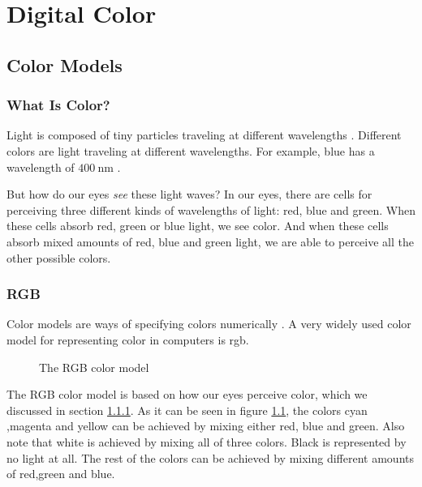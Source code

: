 \begin{comment}
  
\end{comment}

\chapter{Digital Color}
\label{cha:color}

\begin{refsection}

  \section{Color Models}
  \label{sec:color-models}

  \subsection{What Is Color?}
  \label{sec:what-color}

  \newcommand{\bluewave}{\ensuremath{\SI{400}{\nano\meter}}}

  Light is composed of tiny particles traveling at different
  wavelengths \cite{neider93:_openg_progr_guide}.
  Different colors are light traveling at different wavelengths. For
  example, blue has a wavelength of \bluewave
  \cite{ohlsson99:_digit_bild_kreat}.

  But how do our eyes \textit{see} these light waves? In our eyes,
  there are cells for perceiving three different kinds of wavelengths
  of light: red, blue and green. When these cells absorb red, green or
  blue light, we see color. And when these cells absorb mixed amounts
  of red, blue and green light, we are able to perceive all the other
  possible colors.

  \subsection{RGB}
  \label{sec:rgb}

  Color models are ways of specifying colors
  numerically \cite{fadgi11:color_model}. A very widely used color
  model for representing color in computers is rgb.

  \begin{figure}
    \centering
    \caption{The RGB color model}
    \label{fig:rgb}
  \end{figure}

  The RGB color model is based on how our eyes perceive color, which
  we discussed in section \ref{sec:what-color}. As it can be seen in
  figure \ref{fig:rgb}, the colors cyan ,magenta and yellow can be
  achieved by mixing either red, blue and green. Also note that white
  is achieved by mixing all of three colors. Black is represented by
  no light at all. The rest of the colors can be achieved by mixing
  different amounts of red,green and blue.


\end{refsection}
